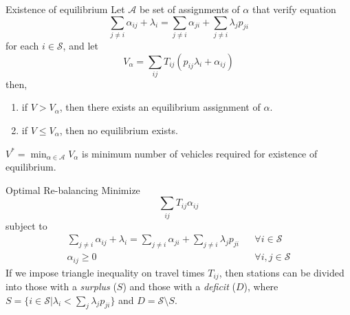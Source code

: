     \begin{frame}{Existence of equilibrium}
    Let $\mathcal{A}$ be set of assignments of $\alpha$ that verify equation
    \begin{equation*}
    \sum_{j \neq i}\alpha_{ij} + \lambda_i = \sum_{j \neq i}\alpha_{ji} + \sum_{j \neq i}\lambda_j p_{ji}
    \end{equation*}
    for each $i \in \mathcal{S}$, 
    \pause
    and let
    \begin{equation*}
    V_{\alpha} = \sum_{ij} T_{ij}(p_{ij} \lambda_i + \alpha_{ij})
    \end{equation*}
    \pause
    then,
    \begin{enumerate}
        \item if $V > V_\alpha$, then there exists an equilibrium assignment of $\alpha$.
        \item if $V \leq V_\alpha$, then no equilibrium exists.
    \end{enumerate}
    \pause
    \alert{$V^* = \min_{\alpha \in \mathcal{A}}V_{\alpha}$ is minimum number of vehicles required for existence of equilibrium.}
    \end{frame}

    \begin{frame}{Optimal Re-balancing}
    Minimize
    \begin{equation*}
    \sum_{ij} T_{ij}\alpha_{ij}
    \end{equation*}
    subject to
    \begin{align*}
        \sum_{j \neq i}\alpha_{ij} + \lambda_i = \sum_{j \neq i}\alpha_{ji} + \sum_{j \neq i}\lambda_j p_{ji} && \forall i \in \mathcal{S} \\
        \alpha_{ij} \geq 0 && \forall{i,j} \in \mathcal{S}
    \end{align*}
    \pause
    \pause
    If we impose triangle inequality on travel times $T_{ij}$, then stations can be divided into those with a \textit{surplus} ($S$) and those with a \textit{deficit} ($D$), where $S = \big\{i \in \mathcal{S} | \lambda_i < \sum_j \lambda_j p_{ji}\big\}$ and $D = \mathcal{S} \setminus S$.
    \end{frame}

